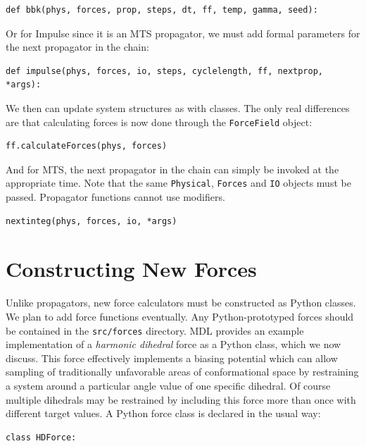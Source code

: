 \documentclass[11pt]{report}
\begin{document}
\begin{verbatim}
def bbk(phys, forces, prop, steps, dt, ff, temp, gamma, seed):
\end{verbatim}

Or for Impulse since it is an MTS propagator, we must add formal parameters
for the next propagator in the chain:

\begin{verbatim}
def impulse(phys, forces, io, steps, cyclelength, ff, nextprop, *args):
\end{verbatim}


We then can update system structures as with classes.  The only real
differences are that calculating forces is now done through the
\texttt{ForceField} object:

\begin{verbatim}
ff.calculateForces(phys, forces)
\end{verbatim}

And for MTS, the next propagator in the chain can simply be invoked
at the appropriate time.  Note that the same \texttt{Physical}, 
\texttt{Forces} and \texttt{IO} objects must be passed.  Propagator
functions cannot use modifiers.

\begin{verbatim}
nextinteg(phys, forces, io, *args)
\end{verbatim}


\chapter{Constructing New Forces}

Unlike propagators, new force calculators must be constructed as Python
classes.  We plan to add force functions eventually.  Any Python-prototyped
forces should be contained in the \texttt{src/forces} directory.  MDL
provides an example implementation of a {\it harmonic dihedral} force
as a Python class, which we now discuss.  This force effectively implements
a biasing potential which can allow sampling of traditionally unfavorable
areas of conformational space by restraining a system around a particular
angle value of one specific dihedral.  Of course multiple dihedrals
may be restrained by including this force more than once with different
target values.  A Python force class is declared in the usual way:

\begin{verbatim}
class HDForce:
\end{verbatim}
\end{document}

